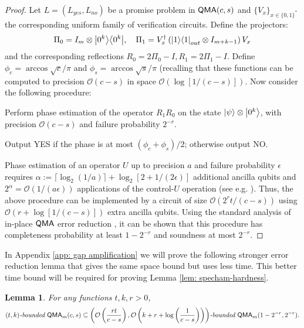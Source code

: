 \documentclass[11pt]{article}
\newtheorem{lemma}[theorem]{Lemma}
\theoremstyle{definition}
\theoremstyle{remark}
\newcommand\QMA{{\sf{QMA}}}
\newcommand\bddQMA[5]{{\left(#1,#2\right)}\textit{-bounded }\QMA_{#3}(#4,#5)}
\newcommand\bigoh{\mathcal{O}}
\begin{document}
\begin{proof}
	Let $L=(L_{yes}, L_{no})$ be a promise problem in $\QMA(c,s)$ and $\{V_x\}_{x\in\{0,1\}^*}$ the corresponding uniform family of verification circuits.
Define the projectors:
\begin{equation}
\Pi_0 = I_m \otimes {\left\vert{0^k}\right\rangle}{\left\langle{0^k}\right\vert}, \quad \Pi_1 = V^\dagger_x \left({\left\vert{1}\right\rangle}{\left\langle{1}\right\vert}_{out} \otimes I_{m+k-1}\right) V_x
\end{equation}
and the corresponding reflections
$R_0 = 2\Pi_0 - I, R_1 = 2\Pi_1 - I$.
Define $\phi_c = \arccos\sqrt{c}/\pi$ and $\phi_s = \arccos\sqrt{s}/\pi$ (recalling that these functions can be computed to precision $\bigoh (c-s)$ in space $\bigoh (\log[1/(c-s)])$. 
Now consider the following procedure:
\begin{compactenum}
\item Perform phase estimation of the operator $R_1R_0$ on the state ${\left\vert{\psi}\right\rangle}\otimes {\left\vert{0^k}\right\rangle}$, with precision $\bigoh (c-s)$ and failure probability $2^{-r}$.
\item Output YES if the phase is at most $(\phi_{c}+\phi_{s})/2$; otherwise output NO.
\end{compactenum}
Phase estimation of an operator $U$ up to precision $a$ and failure probability $\epsilon$ requires $\alpha := \lceil\log_2(1/a)\rceil + \log_2[2+1/(2\epsilon)]$ additional ancilla qubits and $2^\alpha = \mathcal{O}(1/(a\epsilon))$ applications of the control-$U$ operation (see e.g. \cite{nc00}).  Thus, the above procedure can be implemented by a circuit of size $\mathcal{O}(2^{r}t/(c-s))$ using $\mathcal{O}(r+\log[1/(c-s)])$ extra ancilla qubits. Using the standard analysis of in-place $\QMA$ error reduction \cite{mw05,nwz11}, it can be shown that this procedure has completeness probability at least $1-2^{-r}$ and soundness at most $2^{-r}$.
\end{proof}

In Appendix \ref{app: gap amplification} we will prove the following stronger error reduction lemma that gives the same space bound but uses less time. This better time bound will be required for proving Lemma \ref{lem: specham-hardness}.

\begin{lemma} \label{lem: gap amp}
For any functions $t,k,r>0$, 
\[
\bddQMA{t}{k}{m}{c}{s}\subseteq\bddQMA{\mathcal{O}\left(\frac{rt}{c-s}\right)}{\mathcal{O}\left(k+r+\log\left(\frac{1}{c-s}\right)\right)}{m}{1-2^{-r}}{2^{-r}}.
\]
\end{lemma}
\end{document}
